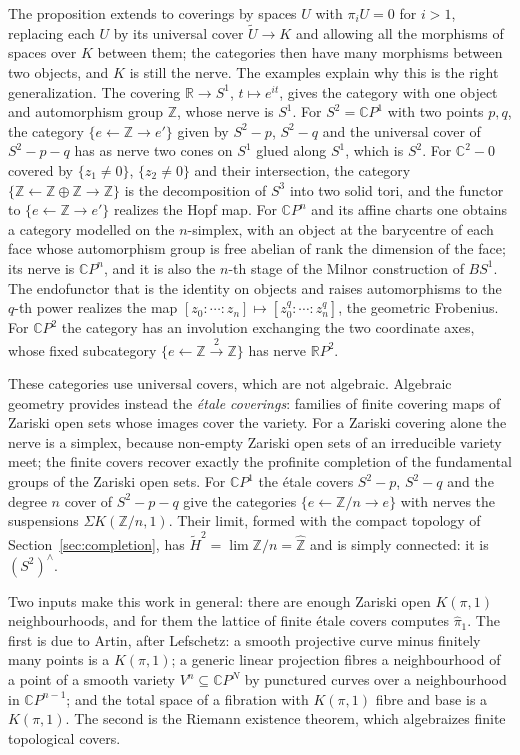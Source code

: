 \documentclass[11pt]{amsart}
\theoremstyle{plain}
\theoremstyle{definition}
\numberwithin{equation}{section}
\newcommand{\Z}{\mathbb{Z}}
\newcommand{\R}{\mathbb{R}}
\newcommand{\C}{\mathbb{C}}
\newcommand{\Zhat}{\widehat{\mathbb{Z}}}
\newcommand{\CP}{\mathbb{C}P}
\newcommand{\RP}{\mathbb{R}P}
\begin{document}
The proposition extends to coverings by spaces $U$ with $\pi_iU=0$ for $i>1$, replacing each $U$ by its universal cover $\widetilde U\to K$ and allowing all the morphisms of spaces over $K$ between them; the categories then have many morphisms between two objects, and $K$ is still the nerve.
The examples explain why this is the right generalization.
The covering $\R\to S^1$, $t\mapsto e^{it}$, gives the category with one object and automorphism group $\Z$, whose nerve is $S^1$.
For $S^2=\CP^1$ with two points $p,q$, the category $\{e\leftarrow\Z\rightarrow e'\}$ given by $S^2-p$, $S^2-q$ and the universal cover of $S^2-p-q$ has as nerve two cones on $S^1$ glued along $S^1$, which is $S^2$.
For $\C^2-0$ covered by $\{z_1\ne0\}$, $\{z_2\ne0\}$ and their intersection, the category $\{\Z\leftarrow\Z\oplus\Z\rightarrow\Z\}$ is the decomposition of $S^3$ into two solid tori, and the functor to $\{e\leftarrow\Z\rightarrow e'\}$ realizes the Hopf map.
For $\CP^n$ and its affine charts one obtains a category modelled on the $n$-simplex, with an object at the barycentre of each face whose automorphism group is free abelian of rank the dimension of the face; its nerve is $\CP^n$, and it is also the $n$-th stage of the Milnor construction of $BS^1$.
The endofunctor that is the identity on objects and raises automorphisms to the $q$-th power realizes the map $[z_0:\cdots:z_n]\mapsto[z_0^q:\cdots:z_n^q]$, the geometric Frobenius.
For $\CP^2$ the category has an involution exchanging the two coordinate axes, whose fixed subcategory $\{e\leftarrow\Z\xrightarrow{2}\Z\}$ has nerve $\RP^2$.

These categories use universal covers, which are not algebraic.
Algebraic geometry provides instead the \emph{\'etale coverings}: families of finite covering maps of Zariski open sets whose images cover the variety.
For a Zariski covering alone the nerve is a simplex, because non-empty Zariski open sets of an irreducible variety meet; the finite covers recover exactly the profinite completion of the fundamental groups of the Zariski open sets.
For $\CP^1$ the \'etale covers $S^2-p$, $S^2-q$ and the degree $n$ cover of $S^2-p-q$ give the categories $\{e\leftarrow\Z/n\rightarrow e\}$ with nerves the suspensions $\Sigma K(\Z/n,1)$.
Their limit, formed with the compact topology of Section~\ref{sec:completion}, has $\widetilde H^2=\lim\Z/n=\Zhat$ and is simply connected: it is $(S^2)^\wedge$.

Two inputs make this work in general: there are enough Zariski open $K(\pi,1)$ neighbourhoods, and for them the lattice of finite \'etale covers computes $\widehat{\pi}_1$.
The first is due to Artin, after Lefschetz: a smooth projective curve minus finitely many points is a $K(\pi,1)$; a generic linear projection fibres a neighbourhood of a point of a smooth variety $V^n\subseteq\CP^N$ by punctured curves over a neighbourhood in $\CP^{n-1}$; and the total space of a fibration with $K(\pi,1)$ fibre and base is a $K(\pi,1)$.
The second is the Riemann existence theorem, which algebraizes finite topological covers.
\end{document}
